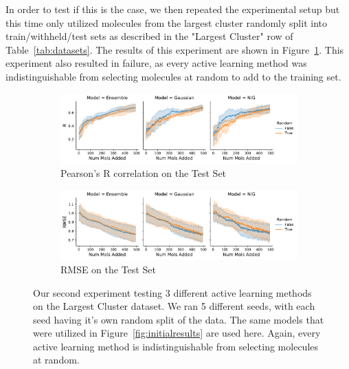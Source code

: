 \documentclass[journal=jmcmar,manuscript=article]{achemso}
\begin{document}
In order to test if this is the case, we then repeated the experimental setup but this time only utilized molecules from the largest cluster randomly split into train/withheld/test sets as described in the "Largest Cluster" row of Table~\ref{tab:datasets}. The results of this experiment are shown in Figure~\ref{fig:lcresults}. This experiment also resulted in failure, as every active learning method was indistinguishable from selecting molecules at random to add to the training set.

\begin{figure}[tbph]
    \centering
    \begin{subfigure}[b]{0.48\textwidth}
        \includegraphics[width=1\linewidth]{figures/fig3_largest_cluster_R.pdf}
        \caption{Pearson's R correlation on the Test Set}
    \end{subfigure}%
    \hfill
    \begin{subfigure}[b]{0.48\textwidth}
        \includegraphics[width=1\linewidth]{figures/fig3_largest_cluster_RMSE.pdf}
        \caption{RMSE on the Test Set}
    \end{subfigure}
    \caption{Our second experiment testing 3 different active learning methods on the Largest Cluster dataset. We ran 5 different seeds, with each seed having it's own random split of the data. The same models that were utilized in Figure~\ref{fig:initialresults} are used here. Again, every active learning method is indistinguishable from selecting molecules at random.}
    \label{fig:lcresults}
\end{figure}
\end{document}
